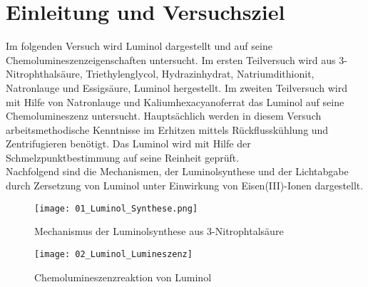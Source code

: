 \section{Einleitung und Versuchsziel}
\label{sec:aufgabenstellung}

Im folgenden Versuch wird Luminol dargestellt und auf seine Chemolumineszenzeigenschaften untersucht. Im ersten Teilversuch wird aus 3-Nitrophthalsäure, Triethylenglycol, Hydrazinhydrat, Natriumdithionit, Natronlauge und Essigsäure, Luminol hergestellt. Im zweiten Teilversuch wird mit Hilfe von Natronlauge und Kaliumhexacyanoferrat das Luminol auf seine Chemolumineszenz untersucht. Hauptsächlich werden in diesem Versuch arbeitsmethodische Kenntnisse im Erhitzen mittels Rückflusskühlung und Zentrifugieren benötigt. Das Luminol wird mit Hilfe der Schmelzpunktbestimmung auf seine Reinheit geprüft.\\
Nachfolgend sind die Mechanismen, der Luminolsynthese und der Lichtabgabe durch Zersetzung von Luminol unter Einwirkung von Eisen(III)-Ionen dargestellt.

\begin{figure}[h!]
	\begin{minipage}[c]{0.45\linewidth}
		\texttt{[image: 01\_Luminol\_Synthese.png]}
		\caption{Mechanismus der Luminolsynthese aus 3-Nitrophtalsäure}
	\end{minipage}
	\hfill
	\begin{minipage}[c]{0.45\linewidth}
		\texttt{[image: 02\_Luminol\_Lumineszenz]}
		\caption{Chemolumineszenzreaktion von Luminol}
	\end{minipage}%
\end{figure}
\FloatBarrier
